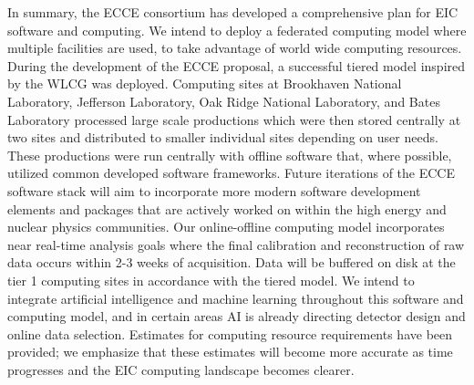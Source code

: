In summary, the ECCE consortium has developed a comprehensive plan for EIC software and computing. We intend to deploy a federated computing model where multiple facilities are used, to take advantage of world wide computing resources. During the development of the ECCE proposal, a successful tiered model inspired by the WLCG was deployed. Computing sites at Brookhaven National Laboratory, Jefferson Laboratory, Oak Ridge National Laboratory, and Bates Laboratory processed large scale productions which were then stored centrally at two sites and distributed to smaller individual sites depending on user needs. These productions were run centrally with offline software that, where possible, utilized common developed software frameworks. Future iterations of the ECCE software stack will aim to incorporate more modern software development elements and packages that are actively worked on within the high energy and nuclear physics communities. Our online-offline computing model incorporates near real-time analysis goals where the final calibration and reconstruction of raw data occurs within 2-3 weeks of acquisition. Data will be buffered on disk at the tier 1 computing sites in accordance with the tiered model. We intend to integrate artificial intelligence and machine learning throughout this software and computing model, and in certain areas AI is already directing detector design and online data selection. Estimates for computing resource requirements have been provided; we emphasize that these estimates will become more accurate as time progresses and the EIC computing landscape becomes clearer. 